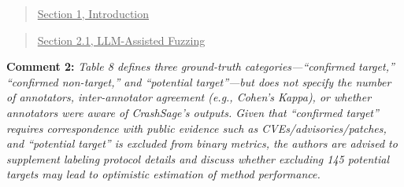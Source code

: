 \documentclass[onecolumn,11pt]{article}
\newcommand{\secc}[2]{\par\mySep \noindent \textsf{\textbf{#1 }}\textit{#2}\par}
\newcommand{\nc}[2]{\needspace{5\baselineskip}\begin{quote}\underline{#1}\\ \nopagebreak[4]{\leavevmode\color{blue}{``#2"}}\end{quote}}
\newcommand{\mySep}{\vspace{8pt}}
\begin{document}
\nc{Section 1, Introduction}{To address this problem, we propose CrashSage, an evidence-guided crash-adjudication pipeline tailored for LLM-assisted fuzzing with incompetent generated drivers.}

\nc{Section 2.1, LLM-Assisted Fuzzing}{Once a generated driver compiles and produces crashes, crash reports are usually treated as fuzzing outcomes rather than as evidence that must be adjudicated under the assumption that the harness may be incompetent.}

\secc{Comment 2:}{Table 8 defines three ground-truth categories---``confirmed target,'' ``confirmed non-target,'' and ``potential target''---but does not specify the number of annotators, inter-annotator agreement (e.g., Cohen's Kappa), or whether annotators were aware of CrashSage's outputs. Given that ``confirmed target'' requires correspondence with public evidence such as CVEs/advisories/patches, and ``potential target'' is excluded from binary metrics, the authors are advised to supplement labeling protocol details and discuss whether excluding 145 potential targets may lead to optimistic estimation of method performance.}
\end{document}
